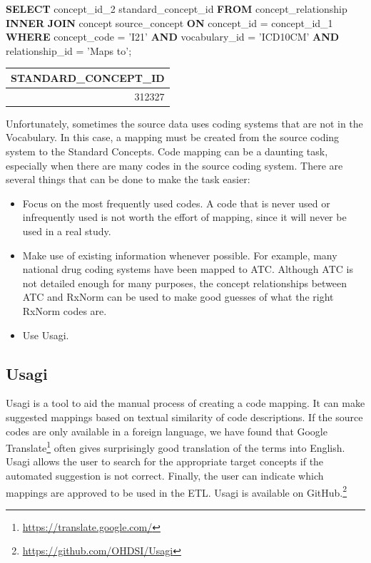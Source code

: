 \documentclass[11pt]{book}
\newenvironment{Shaded}{\begin{snugshade}}{\end{snugshade}}
\newcommand{\KeywordTok}[1]{\textcolor[rgb]{0.13,0.29,0.53}{\textbf{#1}}}
\newcommand{\DecValTok}[1]{\textcolor[rgb]{0.00,0.00,0.81}{#1}}
\newcommand{\StringTok}[1]{\textcolor[rgb]{0.31,0.60,0.02}{#1}}
\newcommand{\NormalTok}[1]{#1}
\providecommand{\tightlist}{%
  \setlength{\itemsep}{0pt}\setlength{\parskip}{0pt}}
\let\rmarkdownfootnote\footnote%
\def\footnote{\protect\rmarkdownfootnote}
\theoremstyle{definition}
\theoremstyle{definition}
\theoremstyle{definition}
\theoremstyle{remark}
\begin{document}
\begin{Shaded}
\begin{Highlighting}[]
\KeywordTok{SELECT}\NormalTok{ concept_id_2 standard_concept_id}
\KeywordTok{FROM}\NormalTok{ concept_relationship}
\KeywordTok{INNER} \KeywordTok{JOIN}\NormalTok{ concept source_concept}
  \KeywordTok{ON}\NormalTok{ concept_id = concept_id_}\DecValTok{1}
\KeywordTok{WHERE}\NormalTok{ concept_code = }\StringTok{'I21'}
  \KeywordTok{AND}\NormalTok{ vocabulary_id = }\StringTok{'ICD10CM'}
  \KeywordTok{AND}\NormalTok{ relationship_id = }\StringTok{'Maps to'}\NormalTok{; }
\end{Highlighting}
\end{Shaded}

\begin{longtable}[]{@{}r@{}}
\toprule
STANDARD\_CONCEPT\_ID\tabularnewline
\midrule
\endhead
312327\tabularnewline
\bottomrule
\end{longtable}

Unfortunately, sometimes the source data uses coding systems that are
not in the Vocabulary. In this case, a mapping must be created from the
source coding system to the Standard Concepts. Code mapping can be a
daunting task, especially when there are many codes in the source coding
system. There are several things that can be done to make the task
easier:

\begin{itemize}
\tightlist
\item
  Focus on the most frequently used codes. A code that is never used or
  infrequently used is not worth the effort of mapping, since it will
  never be used in a real study.
\item
  Make use of existing information whenever possible. For example, many
  national drug coding systems have been mapped to ATC. Although ATC is
  not detailed enough for many purposes, the concept relationships
  between ATC and RxNorm can be used to make good guesses of what the
  right RxNorm codes are.
\item
  Use Usagi.
\end{itemize}

\subsection{Usagi}\label{usagi}

Usagi is a tool to aid the manual process of creating a code mapping. It
can make suggested mappings based on textual similarity of code
descriptions. If the source codes are only available in a foreign
language, we have found that Google Translate\footnote{\url{https://translate.google.com/}}
often gives surprisingly good translation of the terms into English.
Usagi allows the user to search for the appropriate target concepts if
the automated suggestion is not correct. Finally, the user can indicate
which mappings are approved to be used in the ETL. Usagi is available on
GitHub.\footnote{\url{https://github.com/OHDSI/Usagi}} 
\end{document}
